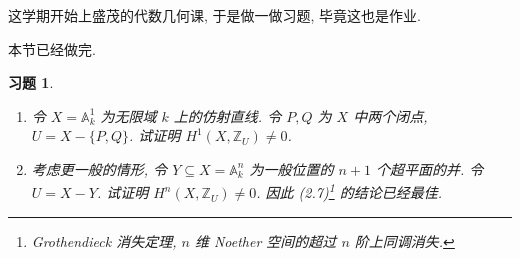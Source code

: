 \documentclass{article}
\theoremstyle{exercise}
\newtheorem{exercise}{习题}[section]
\theoremstyle{theorem}
\theoremstyle{remark}
\def\A{\mathbb{A}}
\def\Z{\mathbb{Z}}
\begin{document}
这学期开始上盛茂的代数几何课, 于是做一做习题, 毕竟这也是作业.

本节已经做完.

\setcounter{section}{2}

\begin{exercise} \hfill
  \begin{enumerate}
    \item 令 $X = \A_k^1$ 为无限域 $k$ 上的仿射直线.
          令 $P, Q$ 为 $X$ 中两个闭点, $U = X - \{P, Q\}$.
          试证明 $H^1(X, \Z_U) \neq 0$.
    \item 考虑更一般的情形,
          令 $Y \subseteq X = \A_k^n$ 为一般位置的 $n + 1$ 个超平面的并.
          令 $U = X - Y$. 试证明 $H^n(X, \Z_U) \neq 0$.
          因此 (2.7)\footnote{
          Grothendieck 消失定理, $n$ 维 Noether 空间的超过 $n$ 阶上同调消失.}
          的结论已经最佳.
  \end{enumerate}
\end{exercise}
\end{document}
